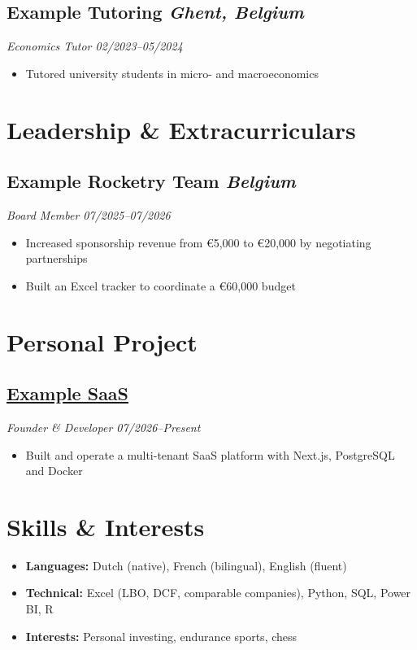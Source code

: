 \documentclass[a4paper,10pt]{article}
\begin{document}
\subsection*{Example Tutoring \hfill \normalfont\textit{Ghent, Belgium}}
\textit{Economics Tutor \hfill 02/2023--05/2024}
\begin{itemize}
    \item Tutored university students in micro- and macroeconomics
\end{itemize}

\section*{Leadership \& Extracurriculars}

\subsection*{Example Rocketry Team \hfill \normalfont\textit{Belgium}}
\textit{Board Member \hfill 07/2025--07/2026}
\begin{itemize}
    \item Increased sponsorship revenue from €5,000 to €20,000 by negotiating partnerships
    \item Built an Excel tracker to coordinate a €60,000 budget
\end{itemize}

\section*{Personal Project}

\subsection*{\href{https://example.com}{Example SaaS}}
\textit{Founder \& Developer \hfill 07/2026--Present}
\begin{itemize}
    \item Built and operate a multi-tenant SaaS platform with Next.js, PostgreSQL and Docker
\end{itemize}

\section*{Skills \& Interests}

\begin{itemize}
    \item \textbf{Languages:} Dutch (native), French (bilingual), English (fluent)
    \item \textbf{Technical:} Excel (LBO, DCF, comparable companies), Python, SQL, Power BI, R
    \item \textbf{Interests:} Personal investing, endurance sports, chess
\end{itemize}
\end{document}
